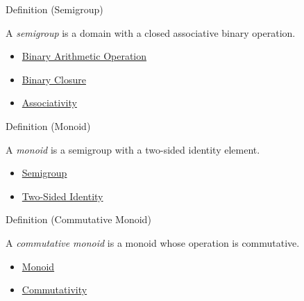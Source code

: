 \begin{definitionbox}{Definition (Semigroup)}
\begin{definition}[Semigroup]
\label{def:semigroup}
A \emph{semigroup} is a domain with a closed associative binary operation.
\end{definition}
\end{definitionbox}

\begin{dependencies}
\begin{itemize}
  \item \hyperref[def:binary-arithmetic-operation]{Binary Arithmetic Operation}
  \item \hyperref[def:binary-closure]{Binary Closure}
  \item \hyperref[def:associativity]{Associativity}
\end{itemize}
\end{dependencies}

\begin{definitionbox}{Definition (Monoid)}
\begin{definition}[Monoid]
\label{def:monoid}
A \emph{monoid} is a semigroup with a two-sided identity element.
\end{definition}
\end{definitionbox}

\begin{dependencies}
\begin{itemize}
  \item \hyperref[def:semigroup]{Semigroup}
  \item \hyperref[def:two-sided-identity]{Two-Sided Identity}
\end{itemize}
\end{dependencies}

\begin{definitionbox}{Definition (Commutative Monoid)}
\begin{definition}
\label{def:commutative-monoid}
A \emph{commutative monoid} is a monoid whose operation is commutative.
\end{definition}
\end{definitionbox}

\begin{dependencies}
\begin{itemize}
  \item \hyperref[def:monoid]{Monoid}
  \item \hyperref[def:commutativity]{Commutativity}
\end{itemize}
\end{dependencies}

